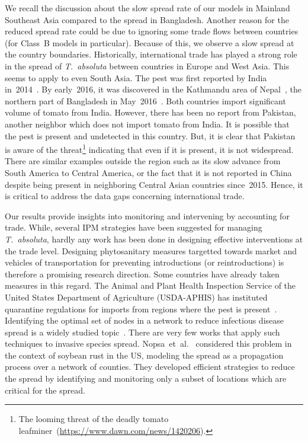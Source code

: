 \documentclass[11pt]{article}
\newcommand{\tuta}{\emph{T.~absoluta}}
\theoremstyle{definition}
\begin{document}
We recall the discussion about the slow spread rate of our models in
Mainland Southeast Asia compared to the spread in Bangladesh. Another reason for the reduced spread rate could be due
to ignoring some trade flows between countries (for Class~B models in
particular). Because of this, we observe
a slow spread at the country boundaries.  Historically, international trade
has played a strong role in the spread of \tuta{} between countries in
Europe and West Asia.  This seems to apply to even South Asia. The pest was
first reported by India
in~2014~\cite{sridhar2014new,kalleshwaraswamy2015occurrence}. By
early~2016, it was discovered in the Kathmandu area of
Nepal~\cite{bajracharya2016first}, the northern part of Bangladesh in
May~2016~\cite{hossain2016first}. Both countries import significant volume
of tomato from India. However, there has been no report from Pakistan,
another neighbor which does not import tomato from India. It is possible
that the pest is present and undetected in this country. But, it is clear
that Pakistan is aware of the threat\footnote{The looming threat of the
deadly tomato leafminer~(\url{https://www.dawn.com/news/1420206}).}
indicating that even if it is present, it is not widespread. There are
similar examples outside the region such as its slow advance from South
America to Central America, or the fact that it is not reported in China
despite being present in neighboring Central Asian countries since~2015.
Hence, it is critical to address the data gaps concerning international
trade.

Our results provide insights into monitoring and intervening by accounting
for trade. While, several IPM strategies have been suggested
for managing \tuta{}, hardly any work has been done in designing effective
interventions at the trade level. Designing phytosanitary measures
targetted towards market and vehicles of transportation for preventing
introductions (or reintroductions) is therefore a promising research
direction. Some countries have already taken measures in this regard. The
Animal and Plant Health Inspection Service of the United States Department
of Agriculture (USDA-APHIS) has instituted quarantine regulations for
imports from regions where the pest is present~\cite{USDA2012}. Identifying
the optimal set of nodes in a network to reduce infectious disease spread
is a widely studied topic~\cite{madar2004immunization}. There are very few
works that apply such techniques to invasive species spread.
Nopsa~et~al.~\cite{nopsa2015ecological} considered this problem in the
context of soybean rust in the US, modeling the spread as a propagation
process over a network of counties. They developed efficient strategies to
reduce the spread by identifying and monitoring only a subset of locations
which are critical for the spread.
\end{document}
